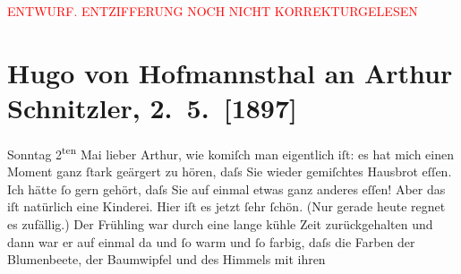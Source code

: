 
\begin{center}
            \textcolor{red}{ENTWURF. ENTZIFFERUNG NOCH NICHT KORREKTURGELESEN}
                      \end{center}
            
               \section[Hugo von Hofmannsthal an Arthur Schnitzler, 2. 5. {[}1897{]}]{ Hugo von Hofmannsthal an Arthur Schnitzler, 2. 5. {[}1897{]}}\nopagebreak{}\rehead{ }\begin{ledgroupsized}[t]{13cm}\normalsize\beginnumbering{} \toendnotes[C]{\smallbreak\pagebreak[2]} 
\toendnotes[C]{\smallbreak}\pstart
           \noindent{}{\pb}\textcolor{gray}{\textbf{\label{T_L00673-1v}\label{T_L00673-1h}}}\pend
           \pstart
           \raggedleft{}Sonntag 2\textsuperscript{ten} Mai\pend
           \pstart{}lieber Arthur,\pend\pstart
           wie komiſch man eigentlich iſt: es hat mich einen Moment ganz ſtark geärgert zu
                    hören, daſs Sie wieder gemiſchtes Hausbrot eſſen. Ich hätte ſo gern gehört, daſs
                    Sie auf einmal etwas ganz anderes eſſen! Aber das iſt natürlich eine
                    Kinderei.\pend
           \pstart
           Hier iſt es jetzt ſehr ſchön. (Nur gerade heute regnet es zufällig.) Der Frühling
                    war {\pb}durch eine lange kühle
                    Zeit zurückgehalten und dann war er auf einmal da und ſo warm und ſo farbig,
                    daſs die Farben der Blumenbeete, der Baumwipfel und des Himmels mit ihren

\end{ledgroupsized}
